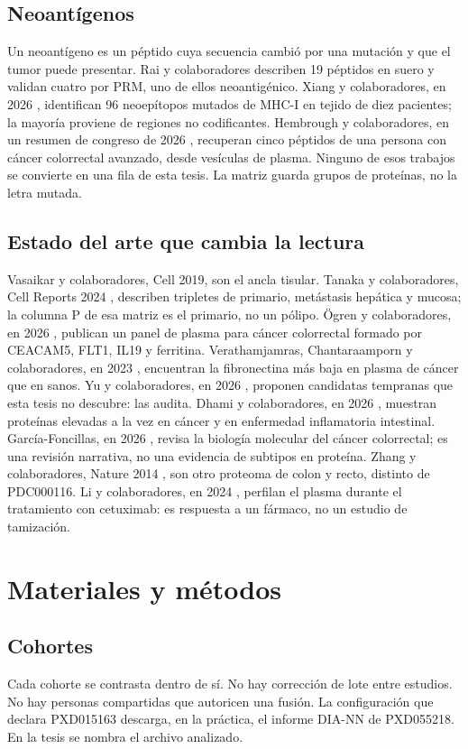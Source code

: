 \documentclass[12pt,oneside]{report}
\begin{document}
\section{Neoantígenos}
Un neoantígeno es un péptido cuya secuencia cambió por una mutación y que el tumor puede presentar. Rai y colaboradores describen 19 péptidos en suero y validan cuatro por PRM, uno de ellos neoantigénico. Xiang y colaboradores, en 2026 \cite{xiang2026}, identifican 96 neoepítopos mutados de MHC-I en tejido de diez pacientes; la mayoría proviene de regiones no codificantes. Hembrough y colaboradores, en un resumen de congreso de 2026 \cite{hembrough2026}, recuperan cinco péptidos de una persona con cáncer colorrectal avanzado, desde vesículas de plasma. Ninguno de esos trabajos se convierte en una fila de esta tesis. La matriz guarda grupos de proteínas, no la letra mutada.

\section{Estado del arte que cambia la lectura}
Vasaikar y colaboradores, Cell 2019, son el ancla tisular. Tanaka y colaboradores, Cell Reports 2024 \cite{tanaka2024}, describen tripletes de primario, metástasis hepática y mucosa; la columna P de esa matriz es el primario, no un pólipo. Ögren y colaboradores, en 2026 \cite{ogren2026}, publican un panel de plasma para cáncer colorrectal formado por CEACAM5, FLT1, IL19 y ferritina. Verathamjamras, Chantaraamporn y colaboradores, en 2023 \cite{verathamjamras2023}, encuentran la fibronectina más baja en plasma de cáncer que en sanos. Yu y colaboradores, en 2026 \cite{yu2026}, proponen candidatas tempranas que esta tesis no descubre: las audita. Dhami y colaboradores, en 2026 \cite{dhami2026}, muestran proteínas elevadas a la vez en cáncer y en enfermedad inflamatoria intestinal. García-Foncillas, en 2026 \cite{garciafoncillas2026}, revisa la biología molecular del cáncer colorrectal; es una revisión narrativa, no una evidencia de subtipos en proteína. Zhang y colaboradores, Nature 2014 \cite{zhang2014}, son otro proteoma de colon y recto, distinto de PDC000116. Li y colaboradores, en 2024 \cite{li2024}, perfilan el plasma durante el tratamiento con cetuximab: es respuesta a un fármaco, no un estudio de tamización.

\chapter{Materiales y métodos}
\section{Cohortes}
Cada cohorte se contrasta dentro de sí. No hay corrección de lote entre estudios. No hay personas compartidas que autoricen una fusión. La configuración que declara PXD015163 descarga, en la práctica, el informe DIA-NN de PXD055218. En la tesis se nombra el archivo analizado.
\end{document}
